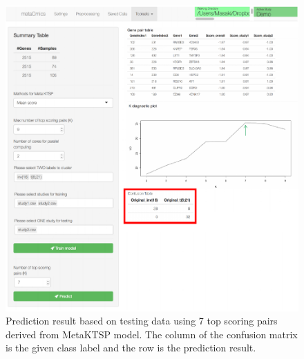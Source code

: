 \begin{figure}[H]
\begin{center}
\includegraphics[scale=0.7]{./figure/MetaKTSP/Figure12.pdf}
\caption{Prediction result based on testing data using 7 top scoring pairs derived from MetaKTSP model. The column of the confusion matrix is the given class label and the row is the prediction result.}
\label{fig:Confusion}
\end{center}
\end{figure}
